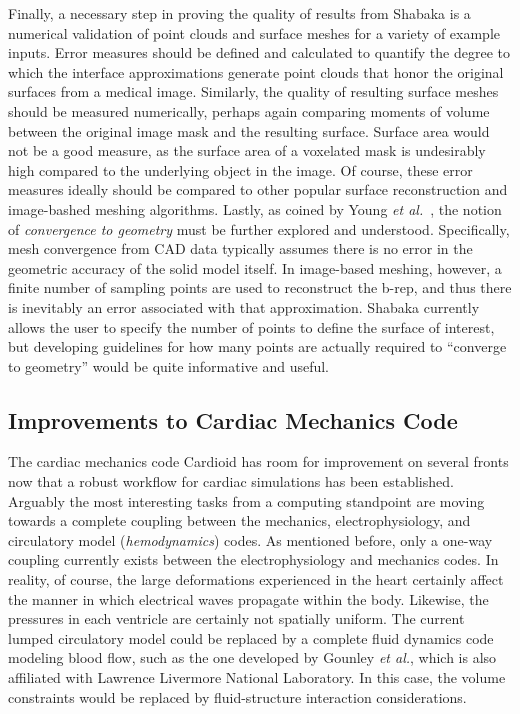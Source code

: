 Finally, a necessary step in proving the quality of results from Shabaka is a numerical validation of point clouds and surface meshes for a variety of example inputs. Error measures should be defined and calculated to quantify the degree to which the interface approximations generate point clouds that honor the original surfaces from a medical image. Similarly, the quality of resulting surface meshes should be measured numerically, perhaps again comparing moments of volume between the original image mask and the resulting surface. Surface area would not be a good measure, as the surface area of a voxelated mask is undesirably high compared to the underlying object in the image. Of course, these error measures ideally should be compared to other popular surface reconstruction and image-bashed meshing algorithms. Lastly, as coined by Young \textit{et al.}~\cite{young_2008}, the notion of \textit{convergence to geometry} must be further explored and understood. Specifically, mesh convergence from CAD data typically assumes there is no error in the geometric accuracy of the solid model itself. In image-based meshing, however, a finite number of sampling points are used to reconstruct the b-rep, and thus there is inevitably an error associated with that approximation. Shabaka currently allows the user to specify the number of points to define the surface of interest, but developing guidelines for how many points are actually required to ``converge to geometry'' would be quite informative and useful.

\subsection{Improvements to Cardiac Mechanics Code}
\label{Improvements to Cardiac Mechanics Code}

The cardiac mechanics code Cardioid has room for improvement on several fronts now that a robust workflow for cardiac simulations has been established. Arguably the most interesting tasks from a computing standpoint are moving towards a complete coupling between the mechanics, electrophysiology, and circulatory model (\textit{hemodynamics}) codes. As mentioned before, only a one-way coupling currently exists between the electrophysiology and mechanics codes. In reality, of course, the large deformations experienced in the heart certainly affect the manner in which electrical waves propagate within the body. Likewise, the pressures in each ventricle are certainly not spatially uniform. The current lumped circulatory model could be replaced by a complete fluid dynamics code modeling blood flow, such as the one developed by Gounley \textit{et al.}, which is also affiliated with Lawrence Livermore National Laboratory. In this case, the volume constraints would be replaced by fluid-structure interaction considerations.

